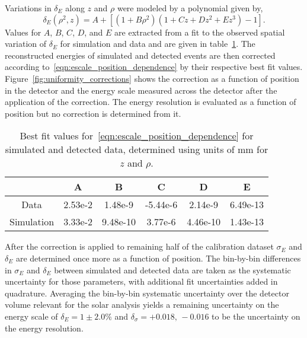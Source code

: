 Variations in $\delta_{E}$ along $z$ and $\rho$ were modeled by a polynomial given by,
\begin{equation}
    \delta_{E}(\rho^{2}, z) = A + \left[(1+B\rho^{2})(1+Cz+Dz^{2}+Ez^{3}) - 1\right]\text{.}
    \label{eqn:escale_position_dependence}
\end{equation}
Values for $A$, $B$, $C$, $D$, and $E$ are extracted from a fit to the observed
spatial variation of $\delta_{E}$ for simulation and data and are given in
table~\ref{tbl:n16_position_escale}.
The reconstructed energies of simulated and detected 
events are then corrected according to~\eqref{eqn:escale_position_dependence} by
their respective best fit values.
Figure~\ref{fig:uniformity_corrections} shows the correction as a function of
position in the detector and the energy scale measured across the detector
after the application of the correction.
The energy resolution is evaluated as a function of position but no correction
is determined from it.
\begin{table}
    \centering
\begin{tabular}{|c | c | c | c |c|c|}
\hline
& A&B&C&D&E\\
\hline
Data& 2.53e-2& 1.48e-9 & -5.44e-6 & 2.14e-9 & 6.49e-13\\
Simulation& 3.33e-2& 9.48e-10& 3.77e-6& 4.46e-10& 1.43e-13\\
\hline
\end{tabular}
\caption{Best fit values for~\eqref{eqn:escale_position_dependence} for
simulated and detected data, determined using units of mm for $z$ and $\rho$.}
\label{tbl:n16_position_escale}
\end{table}

After the correction is applied to remaining half of the calibration dataset
$\sigma_{E}$ and $\delta_{E}$ are determined once more as a function of position.
The bin-by-bin differences in $\sigma_{E}$ and $\delta_{E}$ between
simulated and detected data are taken as the systematic uncertainty for those
parameters, with additional fit uncertainties added in quadrature.
Averaging the bin-by-bin systematic uncertainty over the detector volume relevant
for the solar analysis yields a remaining uncertainty on the energy
scale of $\delta_{E} =1 \pm 2.0\%$ and
$\delta_{\sigma} = +0.018\text{, }-0.016$ to be the uncertainty on
the energy resolution.

